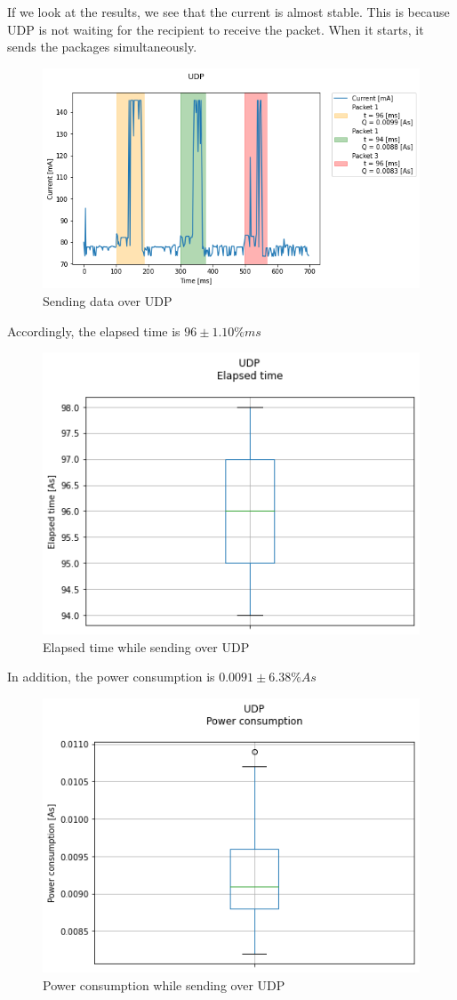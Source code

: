 If we look at the results, we see that the current is almost stable.
This is because UDP is not waiting for the recipient to receive the packet.
When it starts, it sends the packages simultaneously.\linebreak\linebreak
\begin{figure}[H]
\centering
\includegraphics[width = 1 \linewidth]{fig/udp_tcp/udp_s_m.png}
\caption{Sending data over UDP}
\label{fig:udp_s_m}
\end{figure}
Accordingly, the elapsed time is $96 \pm 1.10\% ms$
\linebreak
\begin{figure}[H]
\centering
\includegraphics[width = 0.7 \linewidth]{fig/udp_tcp/udp_boxplot_time.png}
\caption{Elapsed time while sending over UDP}
\label{fig:udp_boxplot_time}
\end{figure}
In addition, the power consumption is $0.0091 \pm 6.38\% As$
\linebreak
\begin{figure}[H]
\centering
\includegraphics[width = 0.7 \linewidth]{fig/udp_tcp/udp_boxplot_As.png}
\caption{Power consumption while sending over UDP}
\label{fig:udp_boxplot_As}
\end{figure}